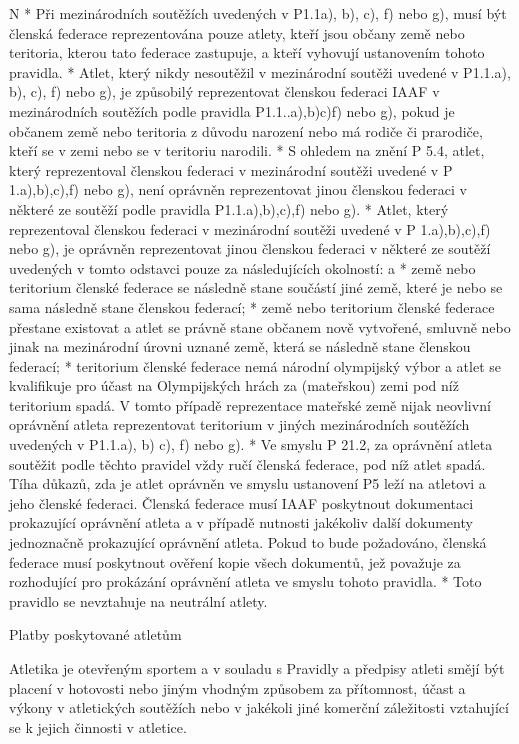 \begitems \style N
* Při mezinárodních soutěžích uvedených v P1.1a), b), c), f) nebo g), musí být členská federace reprezentována pouze atlety, kteří jsou občany země nebo teritoria, kterou tato federace zastupuje, a kteří vyhovují ustanovením tohoto pravidla.
* Atlet, který nikdy nesoutěžil v mezinárodní soutěži uvedené v P1.1.a), b), c), f) nebo g), je způsobilý reprezentovat členskou federaci IAAF v mezinárodních soutěžích podle pravidla P1.1..a),b)c)f) nebo g), pokud je občanem země nebo teritoria z důvodu narození nebo má rodiče či prarodiče, kteří se v zemi nebo se v teritoriu narodili.
* S ohledem na znění P 5.4, atlet, který reprezentoval členskou federaci v mezinárodní soutěži uvedené v P 1.a),b),c),f) nebo g), není oprávněn reprezentovat jinou členskou federaci v některé ze soutěží podle pravidla P1.1.a),b),c),f) nebo g).
* Atlet, který reprezentoval členskou federaci v mezinárodní soutěži uvedené v P 1.a),b),c),f) nebo g), je oprávněn reprezentovat jinou členskou federaci v některé ze soutěží uvedených v tomto odstavci pouze za následujících okolností:
  \begitems \style a
  * země nebo teritorium členské federace se následně stane součástí jiné země, které je nebo se sama následně stane členskou federací;
  * země nebo teritorium členské federace přestane existovat a atlet se právně stane občanem nově vytvořené, smluvně nebo jinak na mezinárodní úrovni uznané země, která se následně stane členskou federací;
  * teritorium členské federace nemá národní olympijský výbor a atlet se kvalifikuje pro účast na Olympijských hrách za (mateřskou) zemi pod níž teritorium spadá. V tomto případě reprezentace mateřské země nijak neovlivní oprávnění atleta reprezentovat teritorium v jiných mezinárodních soutěžích uvedených v P1.1.a), b) c), f) nebo g).
  \enditems
* Ve smyslu P 21.2, za oprávnění atleta soutěžit podle těchto pravidel vždy ručí členská federace, pod níž atlet spadá. Tíha důkazů, zda je atlet oprávněn ve smyslu ustanovení P5 leží na atletovi a jeho členské federaci. Členská federace musí IAAF poskytnout dokumentaci prokazující oprávnění atleta a v případě nutnosti jakékoliv další dokumenty jednoznačně prokazující oprávnění atleta. Pokud to bude požadováno, členská federace musí poskytnout ověření kopie všech dokumentů, jež považuje za rozhodující pro prokázání oprávnění atleta ve smyslu tohoto pravidla.
* Toto pravidlo se nevztahuje na neutrální atlety.
\enditems

\secc Platby poskytované atletům

Atletika je otevřeným sportem a v souladu s Pravidly a předpisy atleti smějí být placení v hotovosti nebo jiným vhodným způsobem za přítomnost, účast a výkony v atletických soutěžích nebo v jakékoli jiné komerční záležitosti vztahující se k jejich činnosti v atletice.

